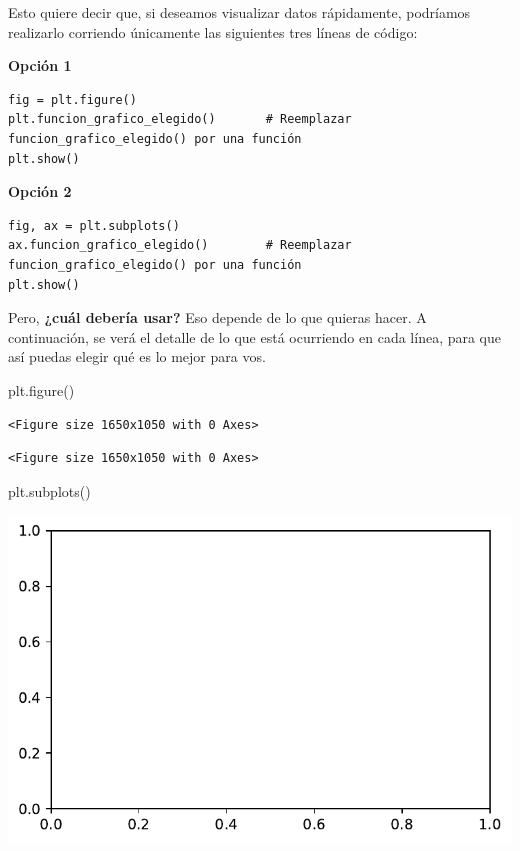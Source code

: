 \documentclass[
  letterpaper,
  DIV=11,
  numbers=noendperiod]{scrreprt}
\newenvironment{Shaded}{\begin{snugshade}}{\end{snugshade}}
\newcommand{\NormalTok}[1]{\textcolor[rgb]{0.00,0.23,0.31}{#1}}
\begin{document}
Esto quiere decir que, si deseamos visualizar datos rápidamente,
podríamos realizarlo corriendo únicamente las siguientes tres líneas de
código:

\textbf{Opción 1}

\begin{verbatim}
fig = plt.figure()  
plt.funcion_grafico_elegido()       # Reemplazar funcion_grafico_elegido() por una función
plt.show()  
\end{verbatim}

\textbf{Opción 2}

\begin{verbatim}
fig, ax = plt.subplots()  
ax.funcion_grafico_elegido()        # Reemplazar funcion_grafico_elegido() por una función     
plt.show()  
\end{verbatim}

Pero, \textbf{¿cuál debería usar?} Eso depende de lo que quieras hacer.
A continuación, se verá el detalle de lo que está ocurriendo en cada
línea, para que así puedas elegir qué es lo mejor para vos.

\begin{Shaded}
\begin{Highlighting}[]
\NormalTok{plt.figure()}
\end{Highlighting}
\end{Shaded}

\begin{verbatim}
<Figure size 1650x1050 with 0 Axes>
\end{verbatim}

\begin{verbatim}
<Figure size 1650x1050 with 0 Axes>
\end{verbatim}

\begin{Shaded}
\begin{Highlighting}[]
\NormalTok{plt.subplots()}
\end{Highlighting}
\end{Shaded}

\includegraphics{unidad_6_files/figure-pdf/cell-109-output-1.pdf}
\end{document}
